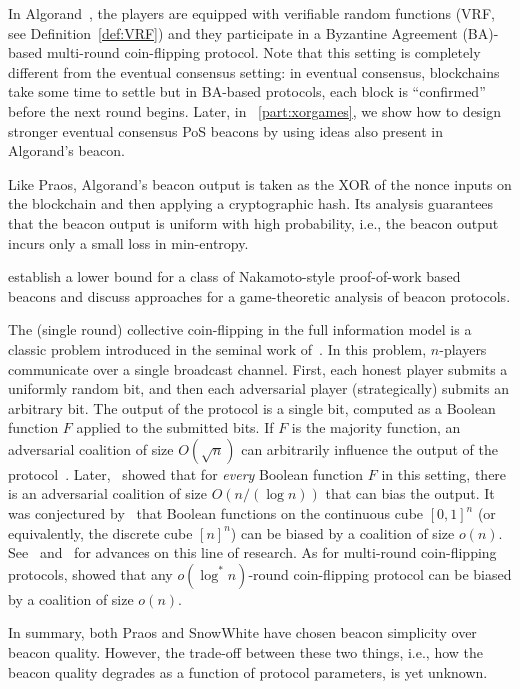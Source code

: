 In Algorand~\cite{Algorand}, the players are equipped with verifiable
random functions (VRF, see Definition~\ref{def:VRF}) 
and they participate in a Byzantine Agreement (BA)-based multi-round
coin-flipping protocol. 
Note that this setting is completely different from 
the eventual consensus setting: 
in eventual consensus, blockchains take some time to settle 
but in BA-based protocols, each block is ``confirmed'' before the next round begins. 
Later, in \Section~\ref{part:xorgames}, 
we show how to design stronger eventual consensus PoS beacons 
by using ideas also present in Algorand's beacon.

Like Praos, Algorand's beacon output is taken as 
the XOR of the nonce inputs on the blockchain and then applying a cryptographic hash.
Its analysis guarantees that the beacon output 
is uniform with high probability, i.e., 
the beacon output incurs only a small loss in min-entropy. 



\citet{ZuckermanBeacon} establish a lower bound for a class of
Nakamoto-style proof-of-work based beacons and discuss approaches for
a game-theoretic analysis of beacon protocols.


The (single round) collective coin-flipping in the full information
model is a classic problem introduced in the seminal work
of~\citet{BL85}.  In this problem, $n$-players communicate over a
single broadcast channel.  First, each honest player submits a
uniformly random bit, and then each adversarial player (strategically)
submits an arbitrary bit.  The output of the protocol is a single bit,
computed as a Boolean function $F$ applied to the submitted bits.  If
$F$ is the majority function, an adversarial coalition of size
$O(\sqrt{n})$ can arbitrarily influence the output of the
protocol~\cite{BL85}.  Later,~\citet*{KKL} showed that for
\emph{every} Boolean function $F$ in this setting, there is an
adversarial coalition of size $O(n/(\log n))$ that can bias the
output.  It was conjectured by~\citet{Friedgut} that Boolean functions
on the continuous cube $[0,1]^n$ (or equivalently, the discrete cube
$[n]^n$) can be biased by a coalition of size $o(n)$.
See~\cite{Hatami} and~\cite{Kalai} for advances on this line of
research.  As for multi-round coin-flipping protocols, \citet*{RSZ}
showed that any $o(\log^* n)$-round coin-flipping protocol can be
biased by a coalition of size $o(n)$.



In summary, both Praos and SnowWhite have chosen beacon simplicity 
over beacon quality. 
However, the trade-off between these two things, 
i.e., how the beacon quality degrades as a function of protocol parameters, 
is yet unknown.
